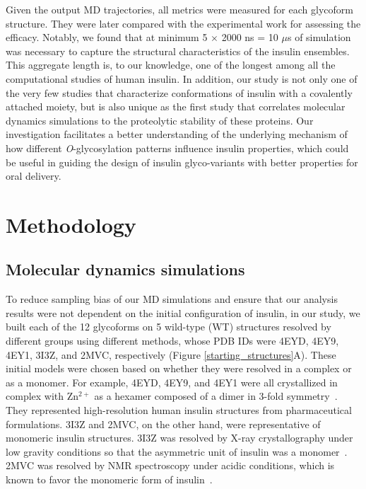 \documentclass[sn-vancouver]{sn-jnl}
\begin{document}
Given the output MD trajectories, all metrics were measured for each glycoform structure. They were later compared with the experimental work for assessing the efficacy. Notably, we found that at minimum 5 $\times$ 2000 ns = 10 $\mu$s of simulation was necessary to capture the structural characteristics of the insulin ensembles. This aggregate length is, to our knowledge, one of the longest among all the computational studies of human insulin. In addition, our study is not only one of the very few studies that characterize conformations of insulin with a covalently attached moiety, but is also unique as the first study that correlates molecular dynamics simulations to the proteolytic stability of these proteins. Our investigation facilitates a better understanding of the underlying mechanism of how different \emph{O}-glycosylation patterns influence insulin properties, which could be useful in guiding the design of insulin glyco-variants with better properties for oral delivery.

\section{Methodology}
\subsection{Molecular dynamics simulations}
To reduce sampling bias of our MD simulations and ensure that our analysis results were not dependent on the initial configuration of insulin, in our study, we built each of the 12 glycoforms on 5 wild-type (WT) structures resolved by different groups using different methods, whose PDB IDs were 4EYD, 4EY9, 4EY1, 3I3Z, and 2MVC, respectively (Figure \ref{starting_structures}A). These initial models were chosen based on whether they were resolved in a complex or as a monomer. For example, 4EYD, 4EY9, and 4EY1 were all crystallized in complex with Zn$^{2+}$ as a hexamer composed of a dimer in 3-fold symmetry~\cite{favero2013structural}. They represented high-resolution human insulin structures from pharmaceutical formulations. 3I3Z and 2MVC, on the other hand, were representative of monomeric insulin structures. 3I3Z was resolved by X-ray crystallography under low gravity conditions so that the asymmetric unit of insulin was a monomer~\cite{timofeev2010x}. 2MVC was resolved by NMR spectroscopy under acidic conditions, which is known to favor the monomeric form of insulin~\cite{kvrivzkova2014structural}.
\end{document}
